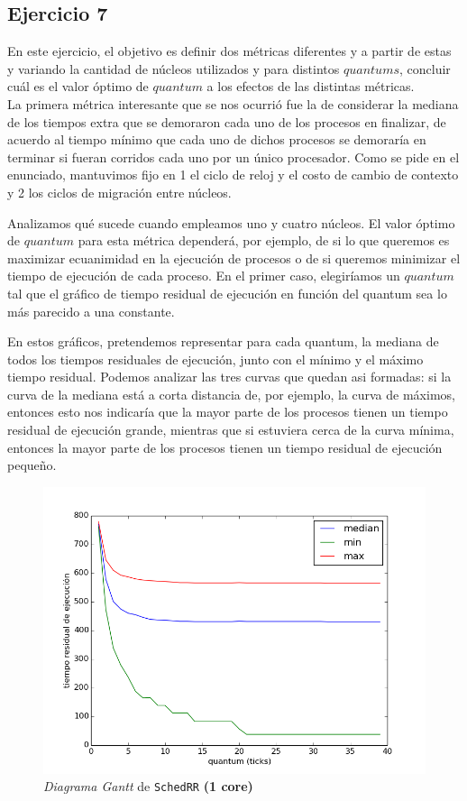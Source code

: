 \documentclass[11pt, a4paper, twoside]{article}
\begin{document}
\clearpage
\subsection{Ejercicio 7}
En este ejercicio, el objetivo es definir dos m\'etricas diferentes y a partir de estas y variando la
cantidad de n\'ucleos utilizados y para distintos $quantums$,  concluir cu\'al es el valor \'optimo de 
$quantum$ a los efectos de las distintas m\'etricas. \\
La primera m\'etrica interesante que se nos ocurri\'o fue la de considerar la mediana de los tiempos extra
que se demoraron cada uno de los procesos en finalizar, de acuerdo al tiempo m\'inimo que cada uno de dichos 
procesos se demorar\'ia en terminar si fueran corridos cada uno por un \'unico procesador. Como se pide en
el enunciado, mantuvimos fijo en 1 el ciclo de reloj y el costo de cambio de contexto y 2 los ciclos de 
migraci\'on entre n\'ucleos.

Analizamos qu\'e sucede cuando empleamos uno y cuatro n\'ucleos. El valor 
\'optimo de $quantum$ para esta m\'etrica depender\'a, por ejemplo, de si lo que queremos es maximizar 
ecuanimidad en la ejecuci\'on de procesos o de si queremos minimizar el tiempo de ejecuci\'on de cada
proceso. En el primer caso, elegir\'iamos un $quantum$ tal que el gr\'afico de tiempo residual de ejecuci\'on
en funci\'on del quantum sea lo m\'as parecido a una constante. 

En estos gráficos, pretendemos representar
para cada quantum, la mediana de todos los tiempos residuales de ejecución, junto con el mínimo
y el máximo tiempo residual. Podemos analizar las tres curvas que quedan asi formadas: si la curva de la 
mediana está a corta distancia de, por ejemplo, la curva de máximos, entonces esto nos indicaría
que la mayor parte de los procesos tienen un tiempo residual de ejecución grande, mientras que si
estuviera cerca de la curva mínima, entonces la mayor parte de los procesos tienen un tiempo residual de 
ejecución pequeño. 

\begin{figure}[H]
  \centering
  \includegraphics [width=\textwidth]{../graficos/metrica_eze_plot_batch_1core_fidedigno.png}
  \caption{\emph{Diagrama Gantt} de \texttt{SchedRR} \textbf{(1 core)}}
  \label{fig:eze-1core}
\end{figure}
\end{document}

